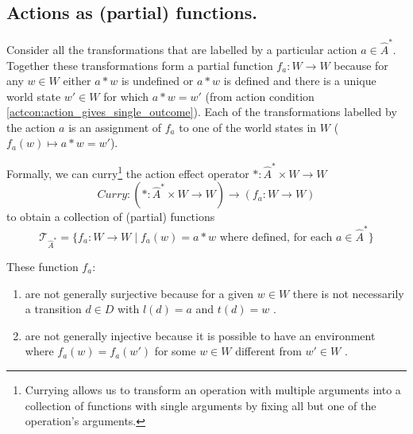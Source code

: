 \subsection{Actions as (partial) functions.}

Consider all the transformations that are labelled by a particular action $a \in \hat{A}^{\ast}$.
Together these transformations form a partial function $f_{a}: W \to W$ because for any $w \in W$ either $a \ast w$ is undefined or $a \ast w$ is defined and there is a unique world state $w' \in W$ for which $a \ast w = w'$ (from action condition \ref{actcon:action_gives_single_outcome}).
Each of the transformations labelled by the action $a$ is an assignment of $f_{a}$ to one of the world states in $W$ ($f_{a}(w) \mapsto a \ast w = w'$).

Formally, we can curry\footnote{Currying allows us to transform an operation with multiple arguments into a collection of functions with single arguments by fixing all but one of the operation's arguments.} the action effect operator $\ast : \hat{A}^{\ast} \times W \to W$
\begin{equation}
	\textit{Curry}: (\ast: \hat{A}^{\ast} \times W \to W) \to (f_{a}: W \to W)
\end{equation}
to obtain a collection of (partial) functions
\begin{equation}
	\mathcal{T}_{\hat{A}^{\ast}} = \{f_{a}: W \to W \mid f_{a}(w) = a \ast w \text{ where defined, for each } a \in \hat{A}^{\ast} \}
\end{equation}

These function $f_{a}$:
\begin{enumerate}[(1)]
	\item are not generally surjective because for a given $w \in W$ there is not necessarily a transition $d \in D$ with $l(d) = a$ and $t(d) = w$ .

	\item are not generally injective because it is possible to have an environment where $f_{a}(w)=f_{a}(w')$ for some $w \in W$ different from $w' \in W$ .
\end{enumerate}


